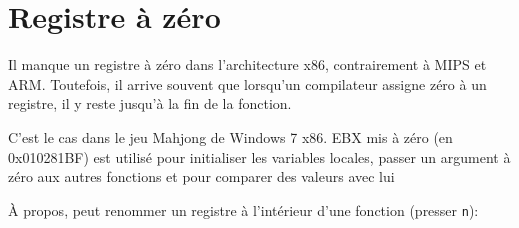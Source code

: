 \section{Registre à zéro}

Il manque un registre à zéro dans l'architecture x86, contrairement à MIPS et ARM.
Toutefois, il arrive souvent que lorsqu'un compilateur assigne zéro à un registre,
il y reste jusqu'à la fin de la fonction.

C'est le cas dans le jeu Mahjong de Windows 7 x86.
EBX mis à zéro (en 0x010281BF) est utilisé pour initialiser les variables locales,
passer un argument à zéro aux autres fonctions et pour comparer des valeurs avec lui



À propos, \IDA peut renommer un registre à l'intérieur d'une fonction (presser \verb|n|):



